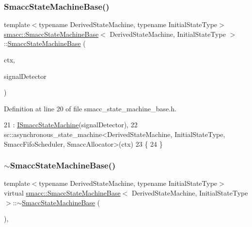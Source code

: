 \subsubsection{\texorpdfstring{Smacc\+State\+Machine\+Base()}{SmaccStateMachineBase()}}
{\footnotesize\ttfamily template$<$typename Derived\+State\+Machine, typename Initial\+State\+Type$>$ \\
\hyperlink{structsmacc_1_1SmaccStateMachineBase}{smacc\+::\+Smacc\+State\+Machine\+Base}$<$ Derived\+State\+Machine, Initial\+State\+Type $>$\+::\hyperlink{structsmacc_1_1SmaccStateMachineBase}{Smacc\+State\+Machine\+Base} (\begin{DoxyParamCaption}\item[{\hyperlink{common_8h_af2dcacead80d69b96952496fe413bbfe}{my\+\_\+context}}]{ctx,  }\item[{\hyperlink{classsmacc_1_1SignalDetector}{Signal\+Detector} $\ast$}]{signal\+Detector }\end{DoxyParamCaption})\hspace{0.3cm}{\ttfamily [inline]}}



Definition at line 20 of file smacc\+\_\+state\+\_\+machine\+\_\+base.\+h.


\begin{DoxyCode}
21         : \hyperlink{classsmacc_1_1ISmaccStateMachine_a497c2185584adbec3298d4000277b75e}{ISmaccStateMachine}(signalDetector),
22           sc::asynchronous\_state\_machine<DerivedStateMachine, InitialStateType, SmaccFifoScheduler,
       SmaccAllocator>(ctx)
23     \{
24     \}
\end{DoxyCode}
\mbox{\label{structsmacc_1_1SmaccStateMachineBase_af08edc30fb749631b5459eb7438129ec}} 
\subsubsection{\texorpdfstring{$\sim$\+Smacc\+State\+Machine\+Base()}{~SmaccStateMachineBase()}}
{\footnotesize\ttfamily template$<$typename Derived\+State\+Machine, typename Initial\+State\+Type$>$ \\
virtual \hyperlink{structsmacc_1_1SmaccStateMachineBase}{smacc\+::\+Smacc\+State\+Machine\+Base}$<$ Derived\+State\+Machine, Initial\+State\+Type $>$\+::$\sim$\hyperlink{structsmacc_1_1SmaccStateMachineBase}{Smacc\+State\+Machine\+Base} (\begin{DoxyParamCaption}{ }\end{DoxyParamCaption})\hspace{0.3cm}{\ttfamily [inline]}, {\ttfamily [virtual]}}



